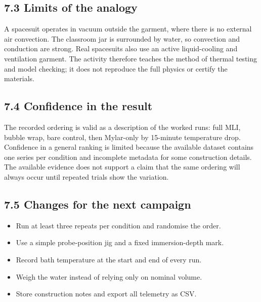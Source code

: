 \documentclass[10pt,conference,a4paper]{IEEEtran}
\begin{document}
\subsection*{7.3 Limits of the analogy}

A spacesuit operates in vacuum outside the garment, where there is no external air convection. The classroom jar is surrounded by water, so convection and conduction are strong. Real spacesuits also use an active liquid-cooling and ventilation garment. The activity therefore teaches the method of thermal testing and model checking; it does not reproduce the full physics or certify the materials.

\subsection*{7.4 Confidence in the result}

The recorded ordering is valid as a description of the worked runs: full MLI, bubble wrap, bare control, then Mylar-only by 15-minute temperature drop. Confidence in a general ranking is limited because the available dataset contains one series per condition and incomplete metadata for some construction details. The available evidence does not support a claim that the same ordering will always occur until repeated trials show the variation.

\subsection*{7.5 Changes for the next campaign}

\begin{itemize}[leftmargin=*,nosep]

\item Run at least three repeats per condition and randomise the order.

\item Use a simple probe-position jig and a fixed immersion-depth mark.

\item Record bath temperature at the start and end of every run.

\item Weigh the water instead of relying only on nominal volume.

\item Store construction notes and export all telemetry as CSV.

\end{itemize}
\end{document}

